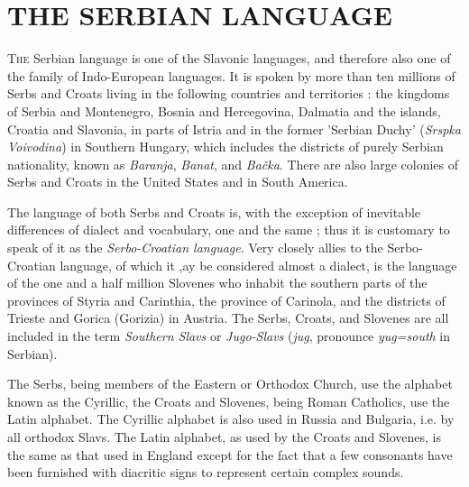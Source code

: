 \chapter{THE SERBIAN LANGUAGE}
        \textsc{The} Serbian language is one of the Slavonic languages, and therefore also one of the family of
        Indo-European languages. It is spoken by more than ten millions of Serbs and
        Croats living in the following countries and territories : the kingdoms of
        Serbia and Montenegro, Bosnia and Hercegovina, Dalmatia and the islands,
        Croatia and Slavonia, in parts of Istria and in the former 'Serbian Duchy'
        (\textit{Srspka Voivodina}) in Southern Hungary, which includes the districts
        of purely Serbian nationality, known as \textit{Baranja}, \textit{Banat}, and
        \textit{Bačka}. There are also large colonies of Serbs and Croats in the United
        States and in South America. 

        The language of both Serbs and Croats is, with the exception of inevitable
        differences of dialect and vocabulary, one and the same ; thus it is customary
        to speak of it as the \textit{Serbo-Croatian language}. Very closely allies to
        the Serbo-Croatian language, of which it ,ay be considered almost a dialect, is
        the language of the one and a half million Slovenes who inhabit the southern
        parts of the provinces of Styria and Carinthia, the province of Carinola, and
        the districts of Trieste and Gorica (Gorizia) in Austria. The Serbs, Croats,
        and Slovenes are all included in the term \textit{Southern Slavs} or
        \textit{Jugo-Slavs} (\textit{jug}, pronounce \textit{yug=south} in Serbian).

        The Serbs, being members of the Eastern or Orthodox Church, use the alphabet
        known as the Cyrillic, the Croats and Slovenes, being Roman Catholics, use the
        Latin alphabet. The Cyrillic alphabet is also used in Russia and Bulgaria, i.e.
        by all orthodox Slavs. The Latin alphabet, as used by the Croats and Slovenes,
        is the same as that used in England except for the fact that a few consonants
        have been furnished with diacritic signs to represent certain complex sounds.

